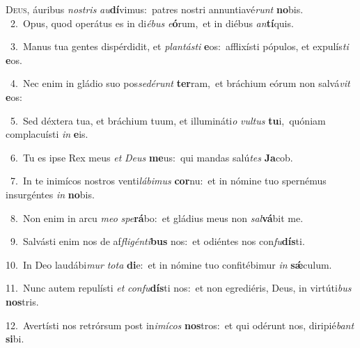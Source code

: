 \lettrine{\initial\textcolor{\initialcolor}{D}}{eus,} áuribus \textit{nos}\-\textit{tris} \textit{au}\-\textbf{dí}vimus:~\star patres nostri annuntiavé\textit{runt} \textbf{no}\-bis.\\
{\numbfont\textcolor{\numbcolor}{~2.}}~Opus, quod operátus es in di\-\textit{é}\-\textit{bus} \textit{e}\-\textbf{ó}rum,~\star et in diébus \textit{an}\-\textbf{tí}quis.\par
{\numbfont\textcolor{\numbcolor}{~3.}}~Manus tua gentes dispérdidit, et \textit{plan}\-\textit{tás}\textit{ti} \textbf{e}\-os:~\star afflixísti pópulos, et expulís\textit{ti} \textbf{e}\-os.\par
{\numbfont\textcolor{\numbcolor}{~4.}}~Nec enim in gládio suo pos\-\textit{se}\-\textit{dé}\textit{runt} \textbf{ter}\-ram,~\star et bráchium eórum non salvá\textit{vit} \textbf{e}\-os:\par
{\numbfont\textcolor{\numbcolor}{~5.}}~Sed déxtera tua, et bráchium tuum, et illumináti\textit{o} \textit{vul}\-\textit{tus} \textbf{tu}\-i,~\star quóniam complacuísti \textit{in} \textbf{e}\-is.\par
{\numbfont\textcolor{\numbcolor}{~6.}}~Tu es ipse Rex meus \textit{et} \textit{De}\-\textit{us} \textbf{me}\-us:~\star qui mandas salú\textit{tes} \textbf{Ja}\-cob.\par
{\numbfont\textcolor{\numbcolor}{~7.}}~In te inimícos nostros venti\-\textit{lá}\-\textit{bi}\textit{mus} \textbf{cor}\-nu:~\star et in nómine tuo spernémus insurgéntes \textit{in} \textbf{no}\-bis.\par
{\numbfont\textcolor{\numbcolor}{~8.}}~Non enim in arcu \textit{me}\-\textit{o} \textit{spe}\-\textbf{rá}bo:~\star et gládius meus non \textit{sal}\-\textbf{vá}bit me.\par
{\numbfont\textcolor{\numbcolor}{~9.}}~Salvásti enim nos de af\-\textit{fli}\-\textit{gén}\textit{ti}\textbf{bus} nos:~\star et odiéntes nos con\-\textit{fu}\-\textbf{dís}ti.\par
{\numbfont\textcolor{\numbcolor}{10.}}~In Deo laudábi\textit{mur} \textit{to}\-\textit{ta} \textbf{di}\-e:~\star et in nómine tuo confitébimur \textit{in} \textbf{sǽ}\-culum.\par
{\numbfont\textcolor{\numbcolor}{11.}}~Nunc autem repulísti \textit{et} \textit{con}\-\textit{fu}\textbf{dís}ti nos:~\star et non egrediéris, Deus, in virtúti\textit{bus} \textbf{nos}\-tris.\par
{\numbfont\textcolor{\numbcolor}{12.}}~Avertísti nos retrórsum post in\-\textit{i}\-\textit{mí}\textit{cos} \textbf{nos}\-tros:~\star et qui odérunt nos, diripié\textit{bant} \textbf{si}\-bi.\par
